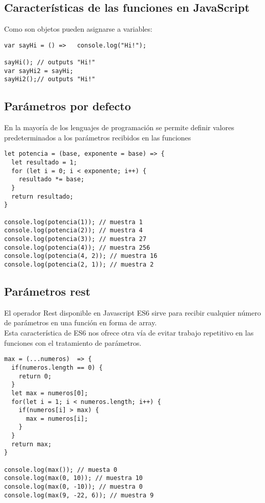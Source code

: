 \documentclass[4paper]{article}
\newcommand{\J}{JavaScript}
\begin{document}
\subsection{Características de las funciones en \J}
Como son objetos pueden asignarse a variables:
\begin{lstlisting}
var sayHi = () =>   console.log("Hi!");

sayHi(); // outputs "Hi!"
var sayHi2 = sayHi;
sayHi2();// outputs "Hi!"
\end{lstlisting}

\subsection{Parámetros por defecto}
En la mayoría de los lenguajes de programación se permite definir valores predeterminados a los parámetros recibidos en las funciones
\begin{lstlisting}
let potencia = (base, exponente = base) => {
  let resultado = 1;
  for (let i = 0; i < exponente; i++) {
    resultado *= base;
  }
  return resultado;
}

console.log(potencia(1)); // muestra 1
console.log(potencia(2)); // muestra 4
console.log(potencia(3)); // muestra 27
console.log(potencia(4)); // muestra 256
console.log(potencia(4, 2)); // muestra 16
console.log(potencia(2, 1)); // muestra 2

\end{lstlisting}


\subsection{Parámetros rest}
El operador Rest disponible en Javascript ES6 sirve para recibir cualquier número de parámetros en una función en forma de array.\\
Esta característica de ES6 nos ofrece otra vía de evitar trabajo repetitivo en las funciones con el tratamiento de parámetros.
\begin{lstlisting}
max = (...numeros)  => {
  if(numeros.length == 0) {
    return 0;
  }
  let max = numeros[0];
  for(let i = 1; i < numeros.length; i++) {
    if(numeros[i] > max) {
      max = numeros[i];
    }
  }
  return max;
}

console.log(max()); // muesta 0
console.log(max(0, 10)); // muestra 10
console.log(max(0, -10)); // muestra 0
console.log(max(9, -22, 6)); // muestra 9

\end{lstlisting}
\end{document}
